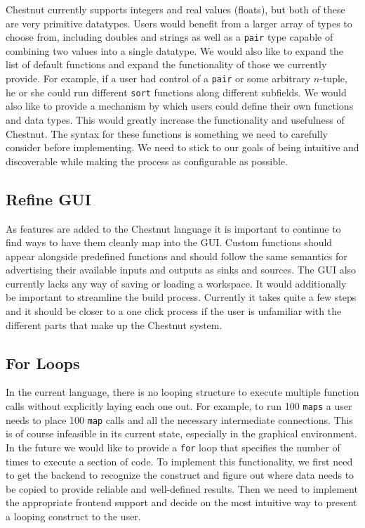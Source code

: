 \documentclass[twocolumn]{article}
\renewcommand{\|}{\origbar} %
\newcommand{\code}[1]{\texttt{#1}}
\begin{document}
Chestnut currently supports integers and real values (floats), but both of these are very primitive datatypes. Users would benefit from a larger array of types to choose from, including doubles and strings as well as a \code{pair} type capable of combining two values into a single datatype. We would also like to expand the list of default functions and expand the functionality of those we currently provide. For example, if a user had control of a \code{pair} or some arbitrary $n$-tuple, he or she could run different \code{sort} functions along different subfields. We would also like to provide a mechanism by which users could define their own functions and data types. This would greatly increase the functionality and usefulness of Chestnut. The syntax for these functions is something we need to carefully consider before implementing. We need to stick to our goals of being intuitive and discoverable while making the process as configurable as possible.

\subsection{Refine GUI}

As features are added to the Chestnut language it is important to continue to find ways to have them cleanly map into the GUI. Custom functions should appear alongside predefined functions and should follow the same semantics for advertising their available inputs and outputs as sinks and sources. The GUI also currently lacks any way of saving or loading a workspace. It would additionally be important to streamline the build process. Currently it takes quite a few steps and it should be closer to a one click process if the user is unfamiliar with the different parts that make up the Chestnut system.

\subsection{For Loops}

In the current language, there is no looping structure to execute multiple function calls without explicitly laying each one out. For example, to run 100 \code{maps} a user needs to place 100 \code{map} calls and all the necessary intermediate connections. This is of course infeasible in its current state, especially in the graphical environment. In the future we would like to provide a \code{for} loop that specifies the number of times to execute a section of code. To implement this functionality, we first need to get the backend to recognize the construct and figure out where data needs to be copied to provide reliable and well-defined results. Then we need to implement the appropriate frontend support and decide on the most intuitive way to present a looping construct to the user.



\end{document}
